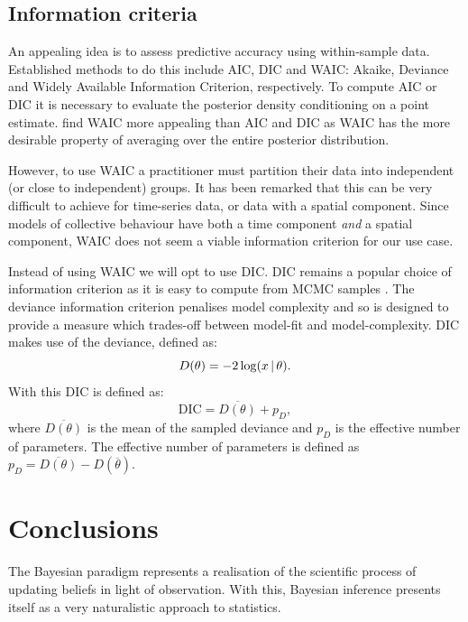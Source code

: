 \subsection{Information criteria}

An appealing idea is to assess predictive accuracy using within-sample data.
Established methods to do this include AIC, DIC and WAIC: Akaike, Deviance and
Widely Available Information Criterion, respectively. To compute AIC or DIC it
is necessary to evaluate the posterior density conditioning on a point
estimate. \textcite{gelman13} find WAIC more appealing than AIC and DIC as
WAIC has the more desirable property of averaging over the entire posterior
distribution.

However, to use WAIC a practitioner must partition their data into independent
(or close to independent) groups. It has been remarked that this can be very
difficult to achieve for time-series data, or data with a spatial component.
Since models of collective behaviour have both a time component \emph{and} a
spatial component, WAIC does not seem a viable information criterion for our
use case.

Instead of using WAIC we will opt to use DIC. DIC remains a popular choice of
information criterion as it is easy to compute from MCMC samples
\parencite{spiegelhalter14}. The deviance information criterion penalises model
complexity and so is designed to provide a measure which trades-off between
model-fit and model-complexity. DIC makes use of the deviance, defined as:
\begin{equation*}
    D(\theta) = -2 \log (x \,|\, \theta).
\end{equation*}
With this DIC is defined as:
\begin{equation*}
    \text{DIC} = \overline{D(\theta)} + p_D,
\end{equation*}
where $\overline{D(\theta)}$ is the mean of the sampled deviance and $p_D$ is
the effective number of parameters. The effective number of parameters is
defined as $p_D = \overline{D(\theta)} - D(\overline{\theta})$.

\section*{Conclusions}

The Bayesian paradigm represents a realisation of the scientific process of
updating beliefs in light of observation. With this, Bayesian inference
presents itself as a very naturalistic approach to statistics.

